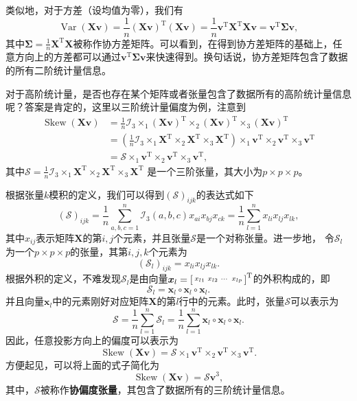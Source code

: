 类似地，对于方差（设均值为零），我们有
\[
    \operatorname{Var}(\mathbf{X} \bm{v}) = \frac{1}{n} \left( \mathbf{X} \bm{v} \right)^{\mathrm{T}} \left( \mathbf{X} \bm{v} \right) = \frac{1}{n} \bm{v}^{\mathrm{T}} \mathbf{X}^{\mathrm{T}} \mathbf{X} \bm{v} = \bm{v}^{\mathrm{T}} \mathbf{\Sigma} \bm{v},
\]
其中\( \mathbf{\Sigma} = \frac{1}{n} \mathbf{X}^{\mathrm{T}} \mathbf{X} \)被称作协方差矩阵。可以看到，在得到协方差矩阵的基础上，任意方向上的方差都可以通过\( \bm{v}^{\mathrm{T}} \mathbf{\Sigma} \bm{v} \)来快速得到。换句话说，协方差矩阵包含了数据的所有二阶统计量信息。

对于高阶统计量，是否也存在某个矩阵或者张量包含了数据所有的高阶统计量信息呢？答案是肯定的，这里以三阶统计量偏度为例，注意到
\[
    \begin{split}
        \operatorname{Skew}(\mathbf{X} \bm{v}) & = \frac{1}{n} \mathcal{I}_3 \times_1 (\mathbf{X} \bm{v})^{\mathrm{T}} \times_2 (\mathbf{X} \bm{v})^{\mathrm{T}} \times_3 (\mathbf{X} \bm{v})^{\mathrm{T}}                                                                             \\
                                               & =  \left( \frac{1}{n} \mathcal{I}_3 \times_1 \mathbf{X}^{\mathrm{T}} \times_2 \mathbf{X}^{\mathrm{T}} \times_3 \mathbf{X}^{\mathrm{T}} \right) \times_1 \bm{v}^{\mathrm{T}} \times_2 \bm{v}^{\mathrm{T}} \times_3 \bm{v}^{\mathrm{T}} \\
                                               & = \mathcal{S} \times_1 \bm{v}^{\mathrm{T}} \times_2 \bm{v}^{\mathrm{T}} \times_3 \bm{v}^{\mathrm{T}},
    \end{split}
\]
其中\( \mathcal{S} = \frac{1}{n} \mathcal{I}_3 \times_1 \mathbf{X}^{\mathrm{T}} \times_2 \mathbf{X}^{\mathrm{T}} \times_3 \mathbf{X}^{\mathrm{T}} \) 是一个三阶张量，其大小为\( p \times p \times p \)。

根据张量\( k \)模积的定义，我们可以得到\( (\mathcal{S})_{ijk}\)的表达式如下
\[
    (\mathcal{S})_{ijk} = \frac{1}{n} \sum_{a, b, c = 1}^n \mathcal{I}_3(a, b, c) x_{ai} x_{bj} x_{ck} = \frac{1}{n} \sum_{l=1}^n x_{li} x_{lj} x_{lk},
\]
其中\( x_{ij} \)表示矩阵\( \mathbf{X} \)的第\( i, j \)个元素，并且张量\( \mathcal{S} \)是一个对称张量。进一步地， 令\( \mathcal{S}_l \) 为一个\( p \times p \times p \)的张量，其第\( i, j, k \)个元素为
\[
    (\mathcal{S}_l)_{ijk} = x_{li} x_{lj} x_{lk}.
\]
根据外积的定义，不难发现\( \mathcal{S}_l \)是由向量\( \boldsymbol{x}_l = \begin{bsmallmatrix} x_{l1} & x_{l2} & \cdots & x_{lp} \end{bsmallmatrix}^{\mathrm{T}} \)的外积构成的，即
\[
    \mathcal{S}_l = \bm{x}_l \circ \bm{x}_l \circ \bm{x}_l.
\]
并且向量\( \bm{x}_l \)中的元素刚好对应矩阵\( \mathbf{X} \)的第\( l \)行中的元素。此时，张量\( \mathcal{S} \)可以表示为
\[
    \mathcal{S} = \frac{1}{n}\sum_{l=1}^n \mathcal{S}_l = \frac{1}{n} \sum_{l=1}^n \bm{x}_l \circ \bm{x}_l \circ \bm{x}_l.
\]
因此，任意投影方向上的偏度可以表示为
\[
    \operatorname{Skew}(\mathbf{X} \bm{v}) = \mathcal{S} \times_1 \bm{v}^{\mathrm{T}} \times_2 \bm{v}^{\mathrm{T}} \times_3 \bm{v}^{\mathrm{T}}.
\]
方便起见，可以将上面的式子简化为
\[
    \operatorname{Skew}(\mathbf{X} \bm{v}) = \mathcal{S} \bm{v}^3,
\]
其中，\( \mathcal{S} \)被称作\textbf{协偏度张量}，其包含了数据所有的三阶统计量信息。

